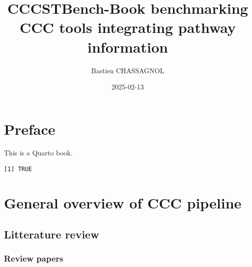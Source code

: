 \documentclass[
  letterpaper,
]{book}
\title{CCCSTBench-Book benchmarking CCC tools integrating pathway
information}
\author{Bastien CHASSAGNOL}
\date{2025-02-13}
\renewcommand*\contentsname{Table of contents}
\newcommand\contentsname{Table of contents}
\begin{document}
\frontmatter
\maketitle

\renewcommand*\contentsname{Table of contents}
{
\setcounter{tocdepth}{2}
\tableofcontents
}
\listoffigures
\listoftables

\mainmatter
{}

\chapter*{Preface}\label{preface}


This is a Quarto book.

\begin{verbatim}
[1] TRUE
\end{verbatim}


\chapter{General overview of CCC
pipeline}\label{general-overview-of-ccc-pipeline}

\section{Litterature review}\label{litterature-review}

\subsection{Review papers}\label{review-papers}
\end{document}
